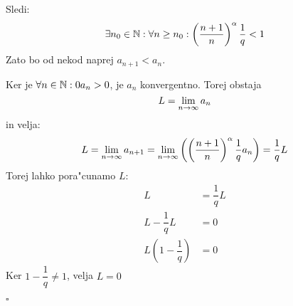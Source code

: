 Sledi:
\begin{equation*}
\exists n_0 \in \mathbb{N}: \forall n \geq n_0: \left(\dfrac{n+1}{n}\right)^\alpha \dfrac{1}{q} < 1
\end{equation*}
Zato bo od nekod naprej $a_{n+1} < a_n$.

Ker je $\forall n \in \mathbb{N}: 0 a_n > 0$, je $a_n$ konvergentno. Torej obstaja
\begin{equation*}
L = \lim_{n \rightarrow \infty} a_n
\end{equation*}
in velja:
\begin{equation*}
L = \lim_{n \rightarrow \infty} a_{n+1} = \lim_{n \rightarrow \infty} \left( \left(\dfrac{n+1}{n} \right)^\alpha \dfrac{1}{q} a_n \right) = \dfrac{1}{q} L
\end{equation*}
Torej lahko pora"cunamo $L$:
\begin{align*}
L &= \dfrac{1}{q} L \\
L - \dfrac{1}{q} L &= 0 \\
L(1-\dfrac{1}{q}) &= 0
\end{align*}
Ker $1- \dfrac{1}{q} \neq 1$, velja $L = 0$

\hfill $\square$

